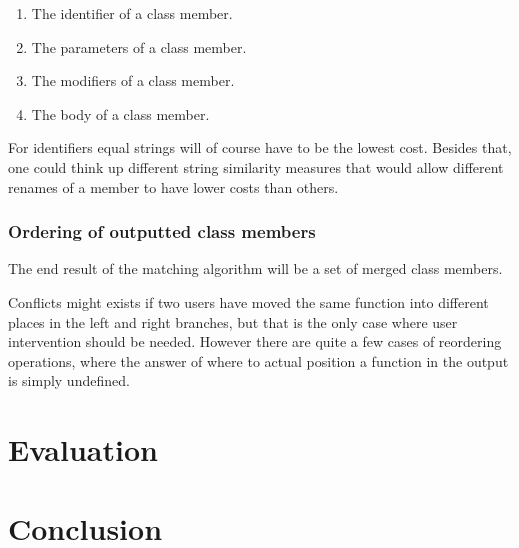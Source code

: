 \documentclass[11pt]{article}
\begin{document}
\begin{enumerate}
	\item The identifier of a class member.
	\item The parameters of a class member.
	\item The modifiers of a class member.
	\item The body of a class member.
\end{enumerate}

For identifiers equal strings will of course have to be the lowest cost. Besides that, one could think up different string similarity measures that would allow different renames of a member to have lower costs than others.

\subsubsection{Ordering of outputted class members}
The end result of the matching algorithm will be a set of merged class members. 

Conflicts might exists if two users have moved the same function into different places in the left and right branches, but that is the only case where user intervention should be needed. However there are quite a few cases of reordering operations, where the answer of where to actual position a function in the output is simply undefined. 



\clearpage
\section{Evaluation}

\clearpage
\section{Conclusion}

\clearpage



\end{document}
